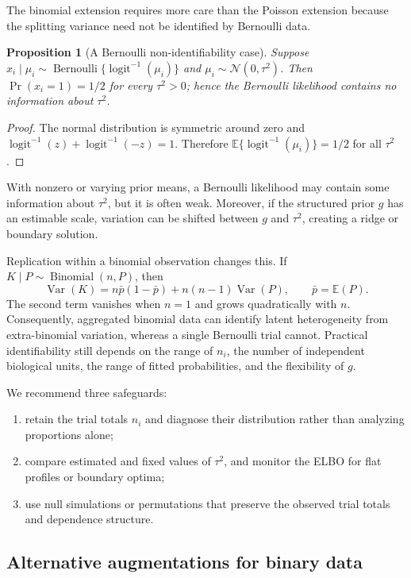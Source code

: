 \documentclass[11pt]{article}
\newtheorem{proposition}[theorem]{Proposition}
\newcommand{\E}{\mathbb{E}}
\newcommand{\V}{\operatorname{Var}}
\newcommand{\N}{\mathcal{N}}
\newcommand{\Bin}{\operatorname{Binomial}}
\newcommand{\Ber}{\operatorname{Bernoulli}}
\newcommand{\sigmoid}{\operatorname{logit}^{-1}}
\begin{document}
The binomial extension requires more care than the Poisson extension because
the splitting variance need not be identified by Bernoulli data.

\begin{proposition}[A Bernoulli non-identifiability case]
Suppose $x_i\mid\mu_i\sim\Ber\{\sigmoid(\mu_i)\}$ and
$\mu_i\sim\N(0,\tau^2)$. Then
$\Pr(x_i=1)=1/2$ for every $\tau^2>0$; hence the Bernoulli likelihood contains
no information about $\tau^2$.
\end{proposition}

\begin{proof}
The normal distribution is symmetric around zero and
$\sigmoid(z)+\sigmoid(-z)=1$. Therefore
$\E\{\sigmoid(\mu_i)\}=1/2$ for all $\tau^2$.
\end{proof}

With nonzero or varying prior means, a Bernoulli likelihood may contain some
information about $\tau^2$, but it is often weak. Moreover, if the structured
prior $g$ has an estimable scale, variation can be shifted between $g$ and
$\tau^2$, creating a ridge or boundary solution.

Replication within a binomial observation changes this. If
$K\mid P\sim\Bin(n,P)$, then
\begin{equation}
 \V(K)=n\bar p(1-\bar p)+n(n-1)\V(P),
 \qquad \bar p=\E(P).
 \label{eq:binomial-overdispersion}
\end{equation}
The second term vanishes when $n=1$ and grows quadratically with $n$.
Consequently, aggregated binomial data can identify latent heterogeneity from
extra-binomial variation, whereas a single Bernoulli trial cannot. Practical
identifiability still depends on the range of $n_i$, the number of independent
biological units, the range of fitted probabilities, and the flexibility of
$g$.

We recommend three safeguards:
\begin{enumerate}
\item retain the trial totals $n_i$ and diagnose their distribution rather
than analyzing proportions alone;
\item compare estimated and fixed values of $\tau^2$, and monitor the ELBO for
flat profiles or boundary optima;
\item use null simulations or permutations that preserve the observed trial
totals and dependence structure.
\end{enumerate}

\subsection{Alternative augmentations for binary data}
\end{document}
